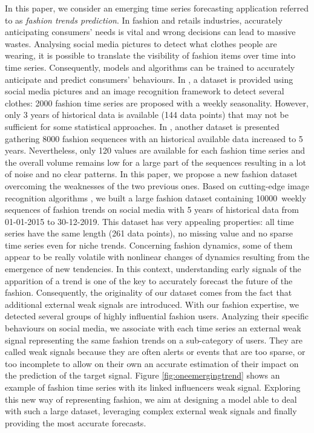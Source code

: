\documentclass[review]{elsarticle}
\newcommand{\numberts}{10000}
\begin{document}
In this paper, we consider an emerging time series forecasting application referred to as {\em fashion trends prediction}. In fashion and retails industries, accurately anticipating consumers' needs is vital and wrong decisions can lead to massive wastes. Analysing social media pictures to detect what clothes people are wearing, it is possible to translate the visibility of fashion items over time into time series. Consequently, models and algorithms can be trained to accurately anticipate and predict consumers' behaviours. In \cite{ma2020}, a  dataset is provided using social media pictures and an image recognition framework to detect several clothes: 2000 fashion time series are proposed with a weekly seasonality. However, only 3 years of historical data is available (144 data points) that may not be sufficient for some statistical approaches. In \cite{ma2020}, another dataset is presented gathering 8000 fashion sequences with an historical available data  increased to 5 years. Nevertheless, only 120 values are available for each fashion time series and the overall volume remains low for a large part of the sequences resulting in a lot of noise and no clear patterns. In this paper, we propose a new fashion dataset overcoming the weaknesses of the two previous ones. Based on cutting-edge image recognition algorithms \cite{ren2015,chollet2017}, we built a large fashion dataset containing \numberts\ weekly sequences of fashion trends on social media with 5 years of historical data from 01-01-2015 to 30-12-2019. This dataset has very appealing properties:  all time series have the same length (261 data points), no missing value and no sparse time series even for niche trends. Concerning fashion dynamics, some of them appear to be really volatile with nonlinear changes of dynamics resulting from the emergence of new tendencies. In this context, understanding early signals of the apparition of a trend is one of the key to accurately forecast the future of the fashion. Consequently, the originality of our dataset comes from the fact that additional external weak signals are introduced. With our fashion expertise, we detected several groups of highly influential fashion users. Analyzing their specific behaviours on social media, we associate with each time series an external weak signal representing the same fashion trends on a sub-category of users. They are called weak signals because they are often alerts or events that are too sparse, or too incomplete to allow on their own an accurate estimation of their impact on the prediction of the target signal. Figure \ref{fig:oneemergingtrend} shows an example of fashion time series with its linked influencers weak signal. Exploring this new way of representing fashion, we aim at designing a model able to deal with such a large dataset, leveraging  complex external weak signals and finally providing the most accurate forecasts.
 
\end{document}
